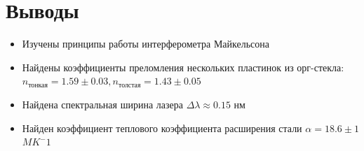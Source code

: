 \documentclass[%
reprint,
russian,
 amsmath,amssymb,
 aps,
]{revtex4-2}
\begin{document}
\section{Выводы}
\begin{itemize}
    \item Изучены принципы работы интерферометра Майкельсона
    \item Найдены коэффициенты преломления нескольких пластинок из орг-стекла: $n_{\text{тонкая}} = 1.59 \pm 0.03, n_{\text{толстая}} = 1.43 \pm 0.05$
    \item Найдена спектральная ширина лазера $\Delta \lambda \approx 0.15$ нм
    \item Найден коэффициент теплового коэффициента расширения стали $\alpha = 18.6 \pm 1$ $MK^-1$
\end{itemize}
\nocite{*}


\end{document}
